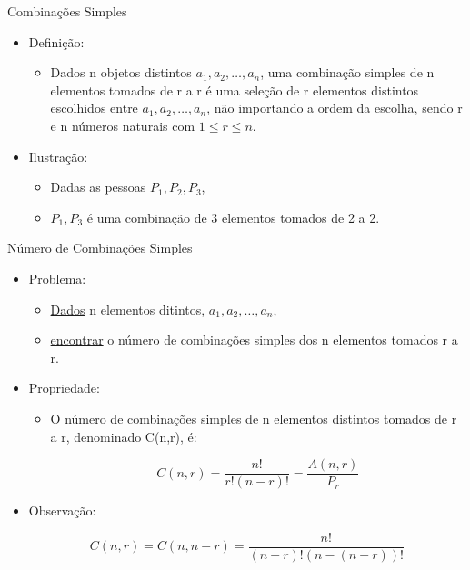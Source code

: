 \documentclass[aspectratio=169]{beamer}
\begin{document}
\begin{frame}{Combinações Simples}
    \begin{itemize}
        \item Definição:
        \begin{itemize}
            \item Dados n objetos distintos $a_1, a_2, \ldots, a_n$, uma combinação simples de n elementos tomados de r a r é uma seleção de r elementos distintos escolhidos entre $a_1, a_2, \ldots, a_n$, não importando a ordem da escolha, sendo r e n números naturais com $1 \leq r \leq n$.
        \end{itemize}
        \item Ilustração:
        \begin{itemize}
            \item Dadas as pessoas $P_1, P_2, P_3$, 
            \item $P_1, P_3$ é uma combinação de 3 elementos tomados de 2 a 2.
        \end{itemize}
    \end{itemize}
\end{frame}


\begin{frame}{Número de Combinações Simples}
    \begin{itemize}
        \item Problema:
        \begin{itemize}
            \item[] \underline{Dados} n elementos ditintos, $a_1, a_2, \ldots, a_n$,
            \item[] \underline{encontrar} o número de combinações simples dos n elementos tomados r a r.
        \end{itemize}
        \item Propriedade:
        \begin{itemize}
            \item O número de combinações simples de n elementos distintos tomados de r a r, denominado C(n,r), é:
            
            $$ C(n,r) = \frac{n!}{r! (n-r)!} = \frac{A(n,r)}{P_r}$$
        \end{itemize}
        \item Observação:
        
            $$ C(n,r) = C(n, n - r ) = \frac{n!}{(n-r)! (n - (n-r))!}$$
        
    \end{itemize}
\end{frame}
\end{document}
